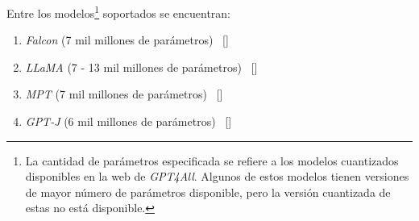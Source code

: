         Entre los modelos\footnote{La cantidad de parámetros especificada se refiere a los modelos cuantizados disponibles en la web de \emph{GPT4All}. Algunos de estos modelos tienen versiones de mayor número de parámetros disponible, pero la versión cuantizada de estas no está disponible.} soportados se encuentran:

        \begin{enumerate}
            \item \emph{Falcon} (7 mil millones de parámetros)~ [\cite{falcon}]
            \item \emph{LLaMA} (7 - 13 mil millones de parámetros)~ [\cite{llama}]
            \item \emph{MPT} (7 mil millones de parámetros)~ [\cite{mpt}]
            \item \emph{GPT-J} (6 mil millones de parámetros)~ [\cite{gptj}]
        \end{enumerate}

